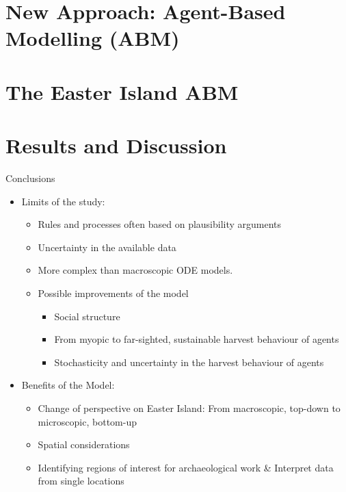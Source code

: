 \documentclass[aspectratio=1610]{beamer}
\begin{document}
\section{New Approach: Agent-Based Modelling (ABM)}



\section{The Easter Island ABM}


\section{Results and Discussion}



\begin{frame}{Conclusions}
\begin{itemize}
	\pause\item Limits of the study:
	\begin{itemize}
		\item Rules and processes often based on plausibility arguments
		\item Uncertainty in the available data
		\item More complex than macroscopic ODE models.
		\item Possible improvements of the model
		\begin{itemize}
			\item Social structure
			\item From myopic to far-sighted, sustainable harvest behaviour of agents
			\item Stochasticity and uncertainty in the harvest behaviour of agents
		\end{itemize}
	\end{itemize}
	\vspace{1cm}
	\pause\item Benefits of the Model:
	\begin{itemize}
		\item Change of perspective on Easter Island: \newline From macroscopic, top-down to microscopic, bottom-up
		\item Spatial considerations
		\item Identifying regions of interest for archaeological work \& \newline Interpret data from single locations
	\end{itemize}
\end{itemize}
\end{frame}
\end{document}
